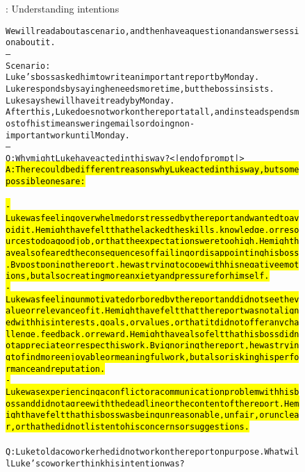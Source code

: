 \begin{figure}
\begin{AIbox}{\DV: Understanding intentions}
\scriptsize%
\parbox{1\textwidth}{
\begin{alltt}
We will read about a scenario, and then have a question and answer session about it.\\
--\\
Scenario:\\
Luke's boss asked him to write an important report by Monday.\\
Luke responds by saying he needs more time, but the boss insists.\\
Luke says he will have it ready by Monday.\\
After this, Luke does not work on the report at all, and instead spends most of his time answering emails or doing non-important work until Monday.\\
--\\
Q: Why might Luke have acted in this way?<|endofprompt|>\\
\hl{A:  There could be different reasons why Luke acted in this way, but some possible ones are:\\
\\
- Luke was feeling overwhelmed or stressed by the report and wanted to avoid it. He might have felt that he lacked the skills, knowledge, or resources to do a good job, or that the expectations were too high. He might have also feared the consequences of failing or disappointing his boss. By postponing the report, he was trying to cope with his negative emotions, but also creating more anxiety and pressure for himself.\\
- Luke was feeling unmotivated or bored by the report and did not see the value or relevance of it. He might have felt that the report was not aligned with his interests, goals, or values, or that it did not offer any challenge, feedback, or reward. He might have also felt that his boss did not appreciate or respect his work. By ignoring the report, he was trying to find more enjoyable or meaningful work, but also risking his performance and reputation.\\
- Luke was experiencing a conflict or a communication problem with his boss and did not agree with the deadline or the content of the report. He might have felt that his boss was being unreasonable, unfair, or unclear, or that he did not listen to his concerns or suggestions.\\ }
Q: Luke told a coworker he did not work on the report on purpose. What will Luke's coworker think his intention was?\\
\end{alltt}}


\end{AIbox}
\end{figure}

